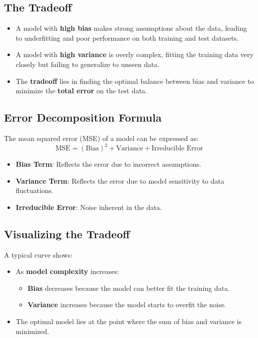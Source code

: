 \subsection*{The Tradeoff}
\begin{itemize}
    \item A model with \textbf{high bias} makes strong assumptions about the data, leading to underfitting and poor performance on both training and test datasets.
    \item A model with \textbf{high variance} is overly complex, fitting the training data very closely but failing to generalize to unseen data.
    \item The \textbf{tradeoff} lies in finding the optimal balance between bias and variance to minimize the \textbf{total error} on the test data.
\end{itemize}

\subsection*{Error Decomposition Formula}
The mean squared error (MSE) of a model can be expressed as:
\[
    \text{MSE} = {(\text{Bias})}^2 + \text{Variance} + \text{Irreducible Error}
\]

\begin{itemize}
    \item \textbf{Bias Term}: Reflects the error due to incorrect assumptions.
    \item \textbf{Variance Term}: Reflects the error due to model sensitivity to data fluctuations.
    \item \textbf{Irreducible Error}: Noise inherent in the data.
\end{itemize}

\subsection*{Visualizing the Tradeoff}
A typical curve shows:

\begin{itemize}
    \item As \textbf{model complexity} increases:
    \begin{itemize}
        \item \textbf{Bias} decreases because the model can better fit the training data.
        \item \textbf{Variance} increases because the model starts to overfit the noise.
    \end{itemize}
    \item The optimal model lies at the point where the sum of bias and variance is minimized.
\end{itemize}

